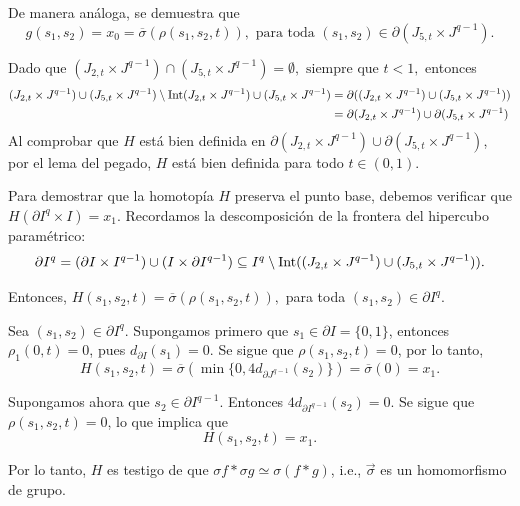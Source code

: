 \begin{dem}
    De manera análoga, se demuestra que
    \begin{equation*}
        g(s_1,s_2)=x_0=\overline{\sigma}(\rho(s_1,s_2,t)), \text{ para toda } (s_1,s_2)\in \partial(J_{5,t}\times J^{q-1}). 
    \end{equation*}
    
    Dado que 
    $(J_{2,t}\times J^{q-1})\cap (J_{5,t}\times J^{q-1})=\emptyset, \text{ siempre que } t<1,$ 
    entonces
    \begin{align*}
        (J_{2,t}\times J^{q-1})\cup (J_{5,t}\times J^{q-1})\setminus \mathrm{Int}(J_{2,t}\times J^{q-1})\cup (J_{5,t}\times J^{q-1})&=\partial((J_{2,t}\times J^{q-1})\cup (J_{5,t}\times J^{q-1}))\\
        &=\partial(J_{2,t}\times J^{q-1})\cup \partial(J_{5,t}\times J^{q-1})
    \end{align*}
    Al comprobar que $H$ está bien definida en $\partial(J_{2,t}\times J^{q-1})\cup \partial(J_{5,t}\times J^{q-1})$, por el lema del pegado, $H$ está bien definida para todo $t \in (0,1)$.

    Para demostrar que la homotopía $H$ preserva el punto base, debemos verificar que $H(\partial I^q\times I) = x_1$. Recordamos la descomposición de la frontera del hipercubo paramétrico:
    \[
        \partial I^q = (\partial I \times I^{q-1}) \cup (I \times \partial I^{q-1})\subseteq I^q\setminus\mathrm{Int}((J_{2,t}\times J^{q-1})\cup (J_{5,t}\times J^{q-1})).
    \]
     
    Entonces, $H(s_1,s_2,t)=\overline{\sigma}(\rho(s_1,s_2,t)),$ para toda $(s_1,s_2)\in\partial I^q$.
     
     Sea $(s_1,s_2)\in \partial I^q$. Supongamos primero que $s_1 \in \partial I = \{0, 1\}$,  entonces $\rho_1(0,t)=0$, pues $d_{\partial I}(s_1) = 0$. Se sigue que $\rho(s_1,s_2,t)=0$, por lo tanto,
     \begin{equation*}
         H(s_1,s_2,t)=\overline{\sigma}(\min\{0,4d_{\partial J^{q-1}}(s_2)\})=\overline{\sigma}(0)=x_1.
     \end{equation*}
     
    Supongamos ahora que $s_2 \in \partial I^{q-1}$. Entonces $4d_{\partial I^{q-1}}(s_2) = 0$. Se sigue que $\rho(s_1,s_2,t)= 0$, lo que implica que
     \begin{equation*}
         H(s_1,s_2,t)=x_1.
     \end{equation*}

     Por lo tanto, $H$ es testigo de que $\sigma f *\sigma g\simeq \sigma(f*g)$, i.e., $\vec{\sigma}$ es un homomorfismo de grupo.
    \end{dem}
